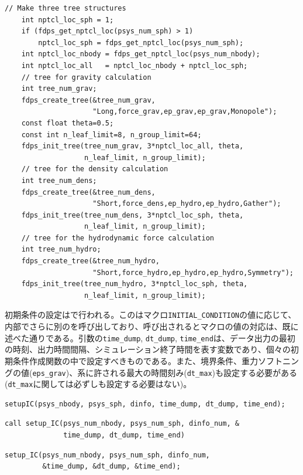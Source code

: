 \begin{lstlisting}[caption=ツリーオブジェクトの生成・初期化]
    // Make three tree structures
    int nptcl_loc_sph = 1;
    if (fdps_get_nptcl_loc(psys_num_sph) > 1)
        nptcl_loc_sph = fdps_get_nptcl_loc(psys_num_sph);
    int nptcl_loc_nbody = fdps_get_nptcl_loc(psys_num_nbody);
    int nptcl_loc_all   = nptcl_loc_nbody + nptcl_loc_sph;
    // tree for gravity calculation
    int tree_num_grav;
    fdps_create_tree(&tree_num_grav,
                     "Long,force_grav,ep_grav,ep_grav,Monopole");
    const float theta=0.5;
    const int n_leaf_limit=8, n_group_limit=64;
    fdps_init_tree(tree_num_grav, 3*nptcl_loc_all, theta,
                   n_leaf_limit, n_group_limit);
    // tree for the density calculation
    int tree_num_dens;
    fdps_create_tree(&tree_num_dens,
                     "Short,force_dens,ep_hydro,ep_hydro,Gather");
    fdps_init_tree(tree_num_dens, 3*nptcl_loc_sph, theta,
                   n_leaf_limit, n_group_limit);
    // tree for the hydrodynamic force calculation
    int tree_num_hydro;
    fdps_create_tree(&tree_num_hydro,
                     "Short,force_hydro,ep_hydro,ep_hydro,Symmetry");
    fdps_init_tree(tree_num_hydro, 3*nptcl_loc_sph, theta,
                   n_leaf_limit, n_group_limit);
\end{lstlisting}
\endifC


初期条件の設定はで行われる。この\procedure はマクロ\texttt{INITIAL\_CONDITION}の値に応じて、内部でさらに別の\procedure を呼び出しており、呼び出される\procedure とマクロの値の対応は、既に述べた通りである。引数の\texttt{time\_dump}, \texttt{dt\_dump}, \texttt{time\_end}は、データ出力の最初の時刻、出力時間間隔、シミュレーション終了時間を表す変数であり、個々の初期条件作成関数の中で設定すべきものである。また、境界条件、重力ソフトニングの値(\texttt{eps\_grav})、系に許される最大の時間刻み(\texttt{dt\_max})も設定する必要がある(\texttt{dt\_max}に関しては必ずしも設定する必要はない)。

\ifCpp %
\begin{lstlisting}[caption=初期条件の設定]
setupIC(psys_nbody, psys_sph, dinfo, time_dump, dt_dump, time_end);
\end{lstlisting}
\endifCpp
\ifFtn %
\begin{lstlisting}[caption=初期条件の設定]
call setup_IC(psys_num_nbody, psys_num_sph, dinfo_num, &
              time_dump, dt_dump, time_end)
\end{lstlisting}
\endifFtn
\ifC %
\begin{lstlisting}[caption=初期条件の設定]
setup_IC(psys_num_nbody, psys_num_sph, dinfo_num,
         &time_dump, &dt_dump, &time_end);
\end{lstlisting}
\endifC


